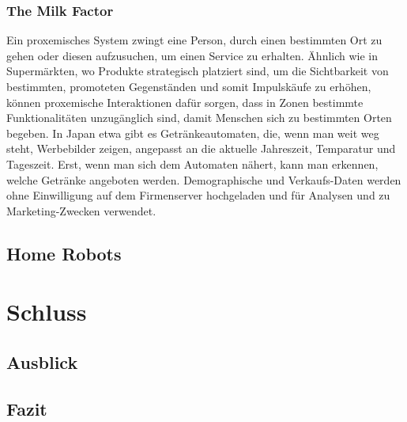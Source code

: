 \documentclass[a4paper]{article}
\begin{document}
\subsubsection{The Milk Factor}
Ein proxemisches System zwingt eine Person, durch einen bestimmten Ort zu gehen oder diesen aufzusuchen, um einen Service zu erhalten.\newline
Ähnlich wie in Supermärkten, wo Produkte strategisch platziert sind, um die Sichtbarkeit von bestimmten, promoteten Gegenständen und somit Impulskäufe zu erhöhen, können proxemische Interaktionen dafür sorgen, dass in Zonen bestimmte Funktionalitäten unzugänglich sind, damit Menschen sich zu bestimmten Orten begeben.\newline
In Japan etwa gibt es Getränkeautomaten, die, wenn man weit weg steht, Werbebilder zeigen, angepasst an die aktuelle Jahreszeit, Temparatur und Tageszeit. Erst, wenn man sich dem Automaten nähert, kann man erkennen, welche Getränke angeboten werden. Demographische und Verkaufs-Daten werden ohne Einwilligung auf dem Firmenserver hochgeladen und für Analysen und zu Marketing-Zwecken verwendet.

\subsection{Home Robots}
\label{sub:home_robots}

\section{Schluss}
\label{sec:schluss}

\subsection{Ausblick}
\label{sub:ausblick}

\subsection{Fazit}
\label{sub:fazit}


\newpage


\printbibliography

%

%
\end{document}
